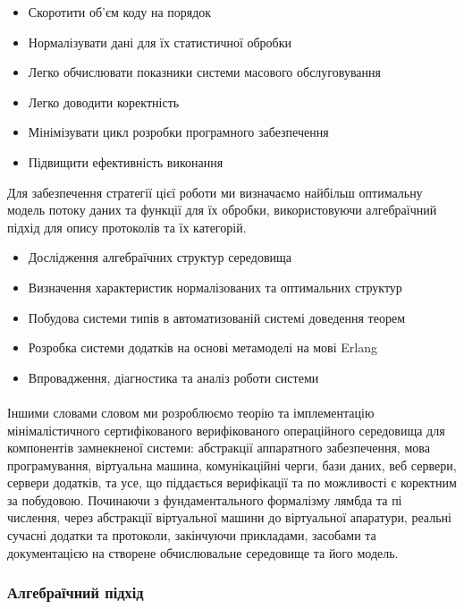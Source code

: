 \documentclass[11pt,oneside]{article}
\begin{document}
\begin{itemize}
   \item Скоротити об’єм коду на порядок
   \item Нормалізувати дані для їх статистичної обробки
   \item Легко обчислювати показники системи масового обслуговування
   \item Легко доводити коректність
   \item Мінімізувати цикл розробки програмного забезпечення
   \item Підвищити ефективність виконання
\end{itemize}

  Для забезпечення стратегії цієї роботи ми визначаємо найбільш оптимальну модель
  потоку даних та функції для їх обробки, використовуючи алгебраїчний підхід
  для опису протоколів та їх категорій.

\begin{itemize}
   \item Дослідження алгебраїчних структур середовища
   \item Визначення характеристик нормалізованих та оптимальних структур
   \item Побудова системи типів в автоматизованій системі доведення теорем
   \item Розробка системи додатків на основі метамоделі на мові Erlang
   \item Впровадження, діагностика та аналіз роботи системи
\end{itemize}

   \paragraph{}
   Іншими словами словом ми розроблюємо теорію та імплементацію мінімалістичного
   сертифікованого верифікованого операційного середовища для компонентів замнекненої системи:
   абстракції аппаратного забезпечення, мова програмування, віртуальна машина, комунікаційні
   черги, бази даних, веб сервери, сервери додатків, та усе, що піддається верифікації та по
   можливості є коректним за побудовою. Починаючи з фундаментального формалізму лямбда та пі числення,
   через абстракції віртуальної машини до віртуальної апаратури, реальні сучасні додатки та протоколи,
   закінчуючи прикладами, засобами та документацією на створене обчислювальне середовище та його модель.\\

\newpage
   \subsubsection*{Алгебраїчний підхід}
\end{document}
